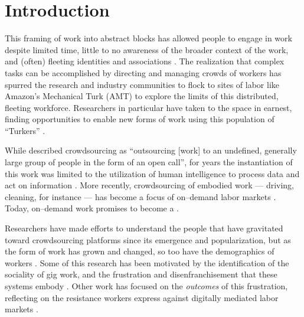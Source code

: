\documentclass[trackingWork]{subfiles}
\begin{document}
\section{Introduction}
This framing of work into  abstract blocks
has allowed people to engage in work despite
limited time,
little to no awareness of the broader context of the work, and 
(often) fleeting identities and associations
\cite{kargerIterativeLearning,mitraComparingStrategies,latozaCrowdDev}.
The realization
that complex tasks can be accomplished by directing and managing crowds of workers
has spurred the research and industry communities to flock to sites of labor
like Amazon's Mechanical Turk (AMT)
to explore the limits of this distributed,  fleeting workforce.
Researchers in particular  have taken to the space in earnest,
finding opportunities to enable new forms of work
using this population of ``Turkers''
\cite{bernsteinSoylent,redballoon,paolacci2010running}.

While \citeauthor{howe2008crowdsourcing} described crowdsourcing as
``outsourcing [work] to an undefined, generally large group of people in the form of an open call'',
for years the instantiation of this work was limited to the utilization of
human intelligence to process data and act on information
\cite{CrowdsourcingUserStudies,movieSummarizationWu,
      yuenSurvey,geiger2011managing,quinnbedersonTaxonomy}.
More recently, crowdsourcing of embodied work
--- driving, cleaning, for instance ---
has become a focus of on--demand labor markets
\cite{uberAlgorithm,uberOfficial,zaarlyOfficial,taskrabbitOfficial}.
Today, on--demand work promises to become a 
.

Researchers have made efforts to understand the people
that have gravitated toward crowdsourcing platforms
since its emergence and popularization,
but as the form of work has grown and changed, so too have the demographics of workers
\cite{Ross,whoareNOTtheTurkers}.
Some of this research has been motivated by the identification of the sociality of gig work,
and the frustration and disenfranchisement that these systems embody
\cite{turkopticon,dynamo}.
Other work has focused on the \textit{outcomes} of this frustration,
reflecting on the resistance workers express against digitally mediated labor markets
\cite{uberAlgorithm}.
\end{document}
